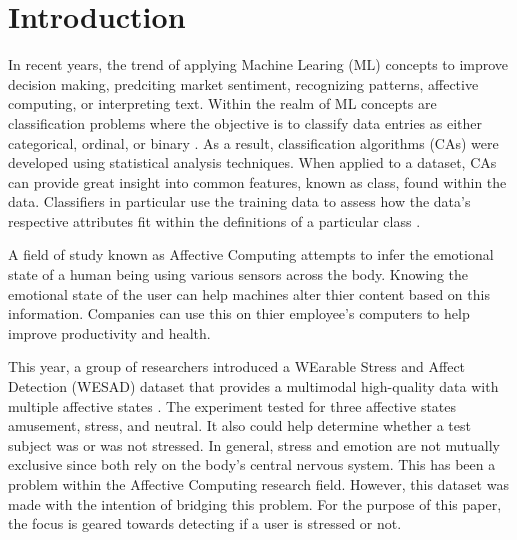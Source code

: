 \section{Introduction}
\label{sec:Introduction}

In recent years, the trend of applying Machine Learing (ML) concepts to improve decision making, predciting 
market sentiment, recognizing patterns, affective computing, or interpreting text. 
Within the realm of ML concepts are classification problems where the objective is to classify data entries 
as either categorical, ordinal, or binary \cite{textbook}. 
As a result, classification algorithms (CAs) were developed using statistical analysis techniques. 
When applied to a dataset, CAs can provide great insight into common features, known as class,
found within the data. Classifiers in particular use the training data to assess how the data's respective 
attributes fit within the definitions of a particular class \cite{class}. 

A field of study known as Affective Computing attempts to infer the emotional state of a human being using 
various sensors across the body. Knowing the emotional state of the user can help machines alter thier 
content based on this information. Companies can use this on thier employee's computers to help improve 
productivity and health. 

This year, a group of researchers introduced a WEarable Stress and Affect Detection (WESAD) dataset that 
provides a multimodal high-quality data with multiple affective states \cite{WESAD}. The experiment 
tested for three affective states amusement, stress, and neutral. It also could help determine whether a test 
subject was or was not stressed. In general, stress and emotion are not mutually exclusive since both 
rely on the body's central nervous system. This has been a problem within the Affective Computing 
research field. However, this dataset was made with the intention of bridging this problem. 
For the purpose of this paper, the focus is geared towards detecting if a user is stressed or not.  
